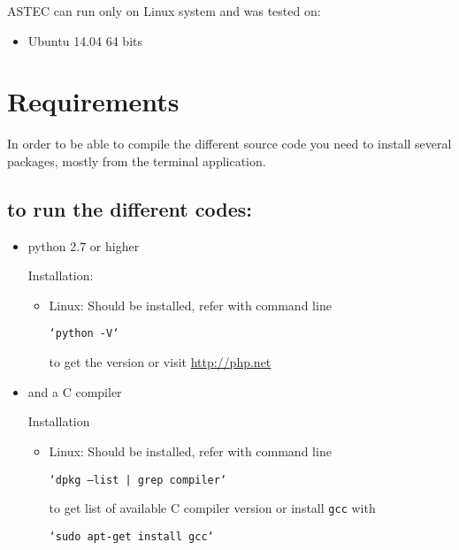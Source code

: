 

ASTEC can run only on Linux system and was tested on:
\begin{itemize}
\item Ubuntu 14.04 64 bits
\end{itemize}



\section{Requirements}
In order to be able to compile the different source code you need to install several packages, mostly from the terminal application.
	    
\subsection{to run the different codes:}
\begin{itemize}
\item python 2.7 or higher  

Installation:
\begin{itemize}
\item Linux: Should be installed, refer with command line 

\texttt{`python -V`} 

to get the version or visit  \url{http://php.net}
\end{itemize}
\item and a C compiler

Installation
\begin{itemize}
\item Linux: Should be installed, refer with command line 

\texttt{`dpkg --list | grep compiler`} 

to get list of available C compiler version or install \texttt{gcc} with 

\texttt{`sudo apt-get install gcc`}
\end{itemize}
\end{itemize}



